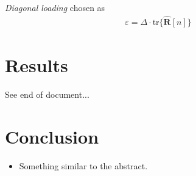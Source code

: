 \documentclass[10pt,journal,draftclsnofoot,onecolumn]{IEEEtran}
\let\MYoriglatexcaption\caption               %
\renewcommand{\caption}[2][\relax]{\MYoriglatexcaption[#2]{#2}}
\newcommand\tr{\text{tr}}
\newcommand\mat[1]{\boldsymbol{#1}}
\newcommand\1{\vec 1}
\newcommand*\eR{\mat{\hat R}}
\begin{document}
\emph{Diagonal loading} chosen as \cite{Synnevag2007}
\begin{align}
\varepsilon = \Delta \cdot \tr\{\eR[n]\}
\end{align}

\section{Results}


See end of document...



\section{Conclusion}

\begin{itemize}
\item Something similar to the abstract.
\end{itemize}


% 
\end{document}
